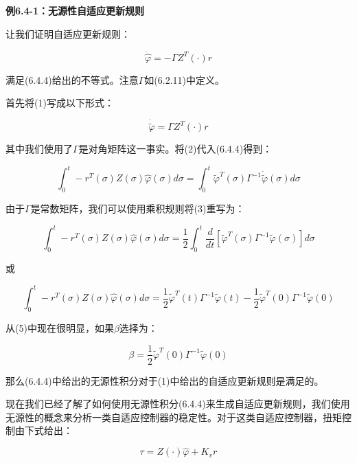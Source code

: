 \documentclass[12pt,a4paper]{ctexart}
\begin{document}
\textbf{例6.4-1：无源性自适应更新规则}

让我们证明自适应更新规则：

\begin{equation}
\dot{\hat{\varphi}} = -\Gamma Z^T(\cdot)r
\end{equation}

满足(6.4.4)给出的不等式。注意$\Gamma$如(6.2.11)中定义。

首先将(1)写成以下形式：

\begin{equation}
\dot{\tilde{\varphi}} = \Gamma Z^T(\cdot)r
\end{equation}

其中我们使用了$\Gamma$是对角矩阵这一事实。将(2)代入(6.4.4)得到：

\begin{equation}
\int_0^t -r^T(\sigma)Z(\sigma)\hat{\varphi}(\sigma)d\sigma = \int_0^t \tilde{\varphi}^T(\sigma)\Gamma^{-1}\dot{\tilde{\varphi}}(\sigma)d\sigma
\end{equation}

由于$\Gamma$是常数矩阵，我们可以使用乘积规则将(3)重写为：

\begin{equation}
\int_0^t -r^T(\sigma)Z(\sigma)\hat{\varphi}(\sigma)d\sigma = \frac{1}{2}\int_0^t \frac{d}{dt}\left[\tilde{\varphi}^T(\sigma)\Gamma^{-1}\tilde{\varphi}(\sigma)\right]d\sigma
\end{equation}

或

\begin{equation}
\int_0^t -r^T(\sigma)Z(\sigma)\hat{\varphi}(\sigma)d\sigma = \frac{1}{2}\tilde{\varphi}^T(t)\Gamma^{-1}\tilde{\varphi}(t) - \frac{1}{2}\tilde{\varphi}^T(0)\Gamma^{-1}\tilde{\varphi}(0)
\end{equation}

从(5)中现在很明显，如果$\beta$选择为：

\begin{equation}
\beta = \frac{1}{2}\tilde{\varphi}^T(0)\Gamma^{-1}\tilde{\varphi}(0)
\end{equation}

那么(6.4.4)中给出的无源性积分对于(1)中给出的自适应更新规则是满足的。

现在我们已经了解了如何使用无源性积分(6.4.4)来生成自适应更新规则，我们使用无源性的概念来分析一类自适应控制器的稳定性。对于这类自适应控制器，扭矩控制由下式给出：

\begin{equation}\label{eq:passivity-control}
\tau = Z(\cdot)\hat{\varphi} + K_v r
\end{equation}
\end{document}
